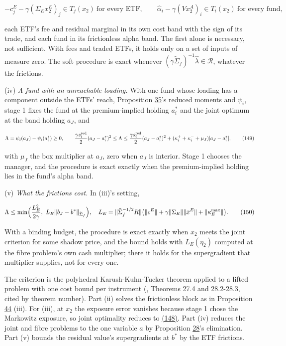 \documentclass[11pt]{article}
\begin{document}
\begin{equation*}
-c^E_j-\gamma(\Sigma_Ex^E_2)_j\in T_j(x_2)\ \text{for every ETF},\qquad
\hat\alpha_i-\gamma(Vx^A_2)_i\in T_i(x_2)\ \text{for every fund},\tag{148}\label{eq:148}
\end{equation*}

each ETF's fee and residual marginal in its own cost band with the
sign of its trade, and each fund in its frictionless alpha band. The
first alone is necessary, not sufficient. With fees and traded ETFs,
it holds only on a set of inputs of measure zero. The soft procedure is
exact whenever \((\gamma\tilde\Sigma_f)^{-1}\hat\lambda\in\mathcal R\), whatever the frictions.

(iv) \emph{A fund with an unreachable loading.} With one fund whose loading
has a component outside the ETFs' reach, Proposition \hyperref[res:Proposition-35]{35}'s reduced
moments and \(\psi_i\), stage 1 fixes the fund at the premium-implied
holding \(a^*_i\) and the joint optimum at the band holding \(a_J\), and

\begin{equation*}
\Lambda=\psi_i(a_J)-\psi_i(a^*_i)\geq0,\qquad
\frac{\gamma s^{\rm red}_i}2(a_J-a^*_i)^2\leq\Lambda\leq\frac{\gamma s^{\rm red}_i}2(a_J-a^*_i)^2+(\kappa^+_i+\kappa^-_i+\mu_J)|a_J-a^*_i|,\tag{149}\label{eq:149}
\end{equation*}

with \(\mu_J\) the box multiplier at \(a_J\), zero when \(a_J\) is interior. Stage 1
chooses the manager, and the procedure is exact exactly when the
premium-implied holding lies in the fund's alpha band.

(v) \emph{What the frictions cost.} In (iii)'s setting,

\begin{equation*}
\Lambda\leq\min\Bigl(\frac{L_E^2}{2\gamma},\ L_E\|b_J-b^*\|_{\tilde\Sigma_f}\Bigr),\quad
L_E=\|\tilde\Sigma_f^{-1/2}R\|\bigl(\|c^E\|+\gamma\|\Sigma_E\|\|\bar x^E\|+\|\kappa^{\max}_E\|\bigr).\tag{150}\label{eq:150}
\end{equation*}

With a binding budget, the procedure is exact exactly when \(x_2\) meets
the joint criterion for some shadow price, and the bound holds with
\(L_E(\eta_2)\) computed at the fibre problem's own cash multiplier; there
it holds for the supergradient that multiplier supplies, not for every
one.

The criterion is the polyhedral Karush-Kuhn-Tucker theorem applied to
a lifted problem with one cost bound per instrument
(\cite{rockafellar1970convex}, Theorems 27.4 and 28.2-28.3, cited by theorem
number). Part (ii) solves the frictionless block as in Proposition \hyperref[res:Proposition-44]{44}
(iii). For (iii), at \(x_2\) the exposure error vanishes because stage 1
chose the Markowitz exposure, so joint optimality reduces to \hyperref[eq:148]{(148)}.
Part (iv) reduces the joint and fibre problems to the one variable
\(a\) by Proposition \hyperref[res:Proposition-28]{28}'s elimination. Part (v) bounds the residual value's
supergradients at \(b^*\) by the ETF frictions.
\end{document}
